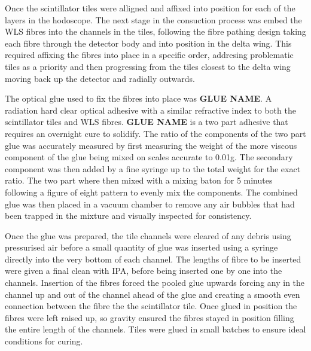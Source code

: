 Once the scintillator tiles were alligned and affixed into position for each of the layers in the hodoscope. The next stage in the consuction process was embed the WLS fibres into the channels in the tiles, following the fibre pathing design taking each fibre through the detector body and into position in the delta wing. This required affixing the fibres into place in a specific order, addresing problematic tiles as a priority and then progressing from the tiles closest to the delta wing moving back up the detector and radially outwards.

The optical glue used to fix the fibres into place was \textbf{GLUE NAME}. A radiation hard clear optical adhesive with a similar refractive index to both the scintillator tiles and WLS fibres. \textbf{GLUE NAME} is a two part adhesive that requires an overnight cure to solidify. The ratio of the components of the two part glue was accurately measured by first measuring the weight of the more viscous component of the glue being mixed on scales accurate to 0.01g. The secondary component was then added by a fine syringe up to the total weight for the exact ratio. The two part where then mixed with a mixing baton for 5 minutes following a figure of eight pattern to evenly mix the components. The combined glue was then placed in a vacuum chamber to remove any air bubbles that had been trapped in the mixture and visually inspected for consistency.

Once the glue was prepared, the tile channels were cleared of any debris using pressurised air before a small quantity of glue was inserted using a syringe directly into the very bottom of each channel. The lengths of fibre to be inserted were given a final clean with IPA, before being inserted one by one into the channels. Insertion of the fibres forced the pooled glue upwards forcing any in the channel up and out of the channel ahead of the glue and creating a smooth even connection between the fibre the the scintillator tile. Once glued in position the fibres were left raised up, so gravity ensured the fibres stayed in position filling the entire length of the channels. Tiles were glued in small batches to ensure ideal conditions for curing. 


